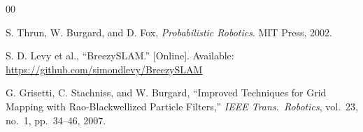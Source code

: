 \documentclass[conference]{IEEEtran}
\begin{document}
  \begin{thebibliography}{00}

  S. Thrun, W. Burgard, and D. Fox, \textit{Probabilistic Robotics}. MIT Press, 2002.

  S. D. Levy et al., ``BreezySLAM.'' [Online]. Available: \url{https://github.com/simondlevy/BreezySLAM}

  G. Grisetti, C. Stachniss, and W. Burgard, ``Improved Techniques for Grid Mapping with Rao-Blackwellized
  Particle Filters,'' \textit{IEEE Trans.~Robotics}, vol.~23, no.~1, pp.~34--46, 2007.

  \end{thebibliography}

  
\end{document}
